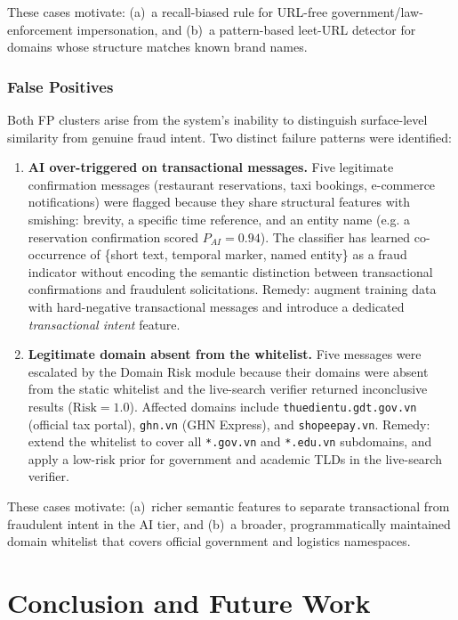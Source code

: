 \documentclass[conference]{IEEEtran}
\begin{document}
These cases motivate: (a)~a recall-biased rule for URL-free
government/law-enforcement impersonation, and (b)~a pattern-based leet-URL
detector for domains whose structure matches known brand names.
 
\subsubsection*{False Positives}
Both FP clusters arise from the system's inability to distinguish
surface-level similarity from genuine fraud intent. Two distinct failure
patterns were identified:
\begin{enumerate}
  \item \textbf{AI over-triggered on transactional messages.} Five legitimate
        confirmation messages (restaurant reservations, taxi bookings,
        e-commerce notifications) were flagged because they share structural
        features with smishing: brevity, a specific time reference, and an
        entity name (e.g. a reservation confirmation scored
        $P_{AI}{=}0.94$). The classifier has learned co-occurrence of
        \{short text, temporal marker, named entity\} as a fraud indicator
        without encoding the semantic distinction between transactional
        confirmations and fraudulent solicitations. Remedy: augment training
        data with hard-negative transactional messages and introduce a
        dedicated \textit{transactional intent} feature.
  \item \textbf{Legitimate domain absent from the whitelist.} Five messages
        were escalated by the Domain Risk module because their domains were
        absent from the static whitelist and the live-search verifier returned
        inconclusive results ($\text{Risk}{=}1.0$). Affected domains include
        \texttt{thuedientu.gdt.gov.vn} (official tax portal),
        \texttt{ghn.vn} (GHN Express), and \texttt{shopeepay.vn}.
        Remedy: extend the whitelist to cover all \texttt{*.gov.vn} and
        \texttt{*.edu.vn} subdomains, and apply a low-risk prior for
        government and academic TLDs in the live-search verifier.
\end{enumerate}
These cases motivate: (a)~richer semantic features to separate transactional
from fraudulent intent in the AI tier, and (b)~a broader, programmatically
maintained domain whitelist that covers official government and
logistics namespaces.
 
\section{Conclusion and Future Work}
\label{sec:conclusion}
\end{document}

